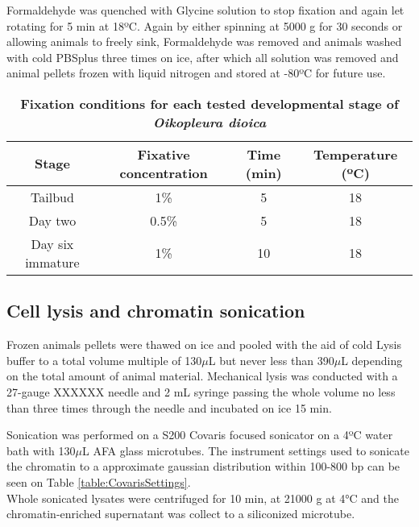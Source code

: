 \documentclass[11pt,twoside,a4paper]{report}
\begin{document}
			Formaldehyde was quenched with Glycine solution to stop fixation and again let rotating for 5 min at 18ºC. 
			Again by either spinning at 5000 g for 30 seconds or allowing animals to freely sink, Formaldehyde was removed and animals washed with cold PBSplus three times on ice, after which all solution was removed and animal pellets frozen with liquid nitrogen and stored at -80ºC for future use.
    
    		 \begin{table}[!ht]
	    	    \caption{\bf{Fixation conditions for each tested developmental stage of \textit{Oikopleura dioica}}}
        		\begin{center}
		            \begin{tabular}{|c|c|c|c|}
        		        \hline
                		\textbf{Stage} & \textbf{Fixative concentration} & \textbf{Time (min)} & \textbf{Temperature (ºC)}\\
		                \hline
		                Tailbud & 1\% & 5 & 18\\
		                Day two & 0.5\% & 5 & 18\\
		                Day six immature & 1\% & 10 & 18\\
		                \hline
        		    \end{tabular}
		        \end{center}
        		\label{table:ODfixation}
		    \end{table}
    
    			\subsection{Cell lysis and chromatin sonication}
			Frozen animals pellets were thawed on ice and pooled with the aid of cold Lysis buffer to a total volume multiple of 130$\mu$L but never less than 390$\mu$L depending on the total amount of animal material.		
			Mechanical lysis was conducted with a 27-gauge XXXXXX needle and 2 mL syringe passing the whole volume no less than three times through the needle and incubated on ice 15 min.
			
			Sonication was performed on a S200 Covaris focused sonicator on a 4ºC water bath with 130$\mu$L AFA glass microtubes. The instrument settings used to sonicate the chromatin to a approximate gaussian distribution within 100-800 bp can be seen on Table \ref{table:CovarisSettings}. \\
			Whole sonicated lysates were centrifuged for 10 min, at 21000 g at 4°C and the chromatin-enriched supernatant was collect to a siliconized microtube.
			
\end{document}

